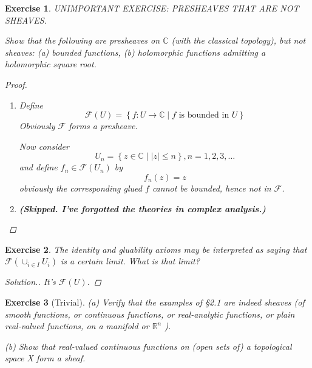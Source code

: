 \documentclass{article}
\theoremstyle{breakstyle}
\newtheorem{exercise}{Exercise}[section]
\newenvironment{solution}
  {\begin{proof}[Solution.]\renewcommand{\qedsymbol}{}}
  {\end{proof}}
\begin{document}
\begin{exercise}
UNIMPORTANT EXERCISE: PRESHEAVES THAT ARE NOT SHEAVES.

Show that the following are presheaves on $\mathbb{C}$ (with the classical
topology), but not sheaves: (a) bounded functions, (b) holomorphic functions
admitting a holomorphic square root.

\begin{proof}
    \begin{enumerate}[label=({\alph*})]
        \item 
            Define
            $$
            \mathscr{F}\left( U \right) =\left\{ f:U\longrightarrow
            \mathbb{C}\mid f\text{ is bounded in } U \right\} 
            $$
            Obviously $\mathscr{F}$ forms a presheave.

            Now consider
            $$
            U_{n}=\left\{ z\in \mathbb{C}\mid \left| z \right| \le n \right\}
            ,n=1,2,3,\ldots 
            $$
            and define $f_{n}\in \mathscr{F}\left( U_{n} \right) $ by
            $$
            f_{n}\left( z \right) =z
            $$
            obviously the corresponding glued $f$ cannot be bounded, hence not
            in $\mathscr{F}$.
        \item \textbf{(Skipped. I've forgotted the theories in complex
            analysis.)}
    \end{enumerate}
\end{proof}

\end{exercise}

\begin{exercise}
The identity and gluability axioms may be interpreted as saying that
$\mathcal{F}(\cup_{i\in I}U_{i})$ is a certain limit. What is that limit?

\begin{solution}
    It's $\mathscr{F}(U)$.
\end{solution}

\end{exercise}

\begin{exercise}[Trivial]
(a) Verify that the examples of §2.1 are indeed sheaves (of smooth functions, or
continuous functions, or real-analytic functions, or plain real-valued
functions, on a manifold or $\mathbb{R}^n$ ).  

(b) Show that real-valued continuous functions on (open sets of) a topological
space X form a sheaf.
\end{exercise}
\end{document}
